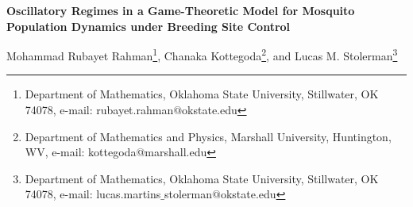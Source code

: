 \documentclass{article}
\theoremstyle{remark}
\theoremstyle{custom} %
\begin{document}



\begin{center}

{\Large \bf Oscillatory Regimes in a Game-Theoretic Model for Mosquito Population Dynamics under Breeding Site Control} 

\vspace{.25cm}
 
{\large Mohammad Rubayet Rahman}\footnote[1]{Department of Mathematics, Oklahoma State University, Stillwater, OK 74078, e-mail: rubayet.rahman$@$okstate.edu},
{\large Chanaka Kottegoda}\footnote[2]{Department of Mathematics and Physics, Marshall University, Huntington, WV, e-mail: kottegoda@marshall.edu },
{\large and Lucas M. Stolerman}\footnote[3]{Department of Mathematics, Oklahoma State University, Stillwater, OK 74078, e-mail: lucas.martins$\_$stolerman$@$okstate.edu}
\vspace{.03cm}
\end{center}



\date{}

\begin{abstract} 


Mosquito-borne diseases remain a major public-health threat, and the effective control of mosquito populations requires sustained household participation in removing breeding sites. While environmental drivers of mosquito oscillations have been extensively studied, the influence of spontaneous household decision-making on the dynamics of mosquito populations remains poorly understood. We introduce a game-theoretic model in which the fraction of households performing breeding site control evolves through imitation dynamics driven by perceived risks. Household behavior regulates the carrying capacity of the aquatic mosquito stage, creating a feedback between control actions and mosquito population growth. For a simplified model with constant payoffs, we characterize four locally stable equilibria, corresponding to full or no household control and the presence or absence of mosquito populations. When the perceived risk of not controlling breeding sites depends on mosquito prevalence, the system admits an additional equilibrium with partial household engagement. We derive conditions under which this equilibrium undergoes a Hopf bifurcation, yielding sustained oscillations arising solely from the interaction between mosquito abundance and household behavior. Numerical simulations and parameter explorations further describe the amplitude and phase properties of these oscillatory regimes.

\end{abstract}
\end{document}
